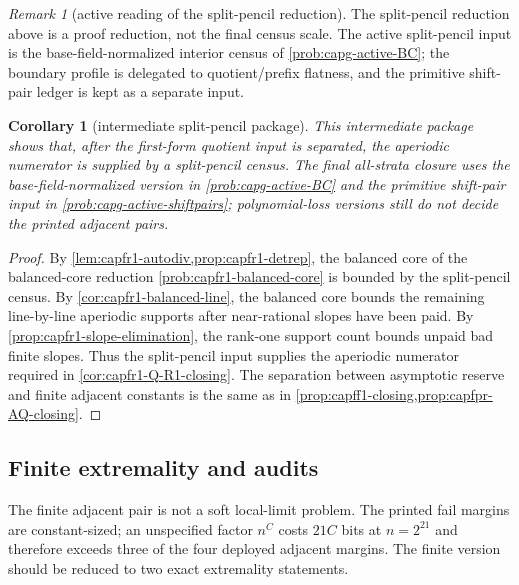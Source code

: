 \documentclass[11pt]{article}
\newtheorem{corollary}[corollary]{Corollary}
\theoremstyle{definition}
\theoremstyle{remark}
\newtheorem{remark}[remark]{Remark}
\begin{document}
\begin{remark}[active reading of the split-pencil reduction]
\label{rem:capfr1-split-pencil-active-reading}
The split-pencil reduction above is a proof reduction, not the final census
scale.  The active split-pencil input is the base-field-normalized interior
census of \cref{prob:capg-active-BC}; the boundary profile is delegated to
quotient/prefix flatness, and the primitive shift-pair ledger is kept as a
separate input.
\end{remark}

\begin{corollary}[intermediate split-pencil package]\label{cor:capfr1-terminal-package}
This intermediate package shows that, after the first-form quotient input is separated, the aperiodic numerator is supplied by a split-pencil census.  The final all-strata closure uses the base-field-normalized version in \cref{prob:capg-active-BC} and the primitive shift-pair input in \cref{prob:capg-active-shiftpairs}; polynomial-loss versions still do not decide the printed adjacent pairs.
\end{corollary}

\begin{proof}
By \cref{lem:capfr1-autodiv,prop:capfr1-detrep}, the balanced core of the balanced-core reduction \cref{prob:capfr1-balanced-core} is bounded by the split-pencil census.  By \cref{cor:capfr1-balanced-line}, the balanced core bounds the remaining line-by-line aperiodic supports after near-rational slopes have been paid.  By \cref{prop:capfr1-slope-elimination}, the rank-one support count bounds unpaid bad finite slopes.  Thus the split-pencil input supplies the aperiodic numerator required in \cref{cor:capfr1-Q-R1-closing}.  The separation between asymptotic reserve and finite adjacent constants is the same as in \cref{prop:capff1-closing,prop:capfpr-AQ-closing}.
\end{proof}

\subsection{Finite extremality and audits}\label{subsec:capfr1-finite-audits}

The finite adjacent pair is not a soft local-limit problem.  The printed fail margins are constant-sized; an unspecified factor \(n^C\) costs \(21C\) bits at \(n=2^{21}\) and therefore exceeds three of the four deployed adjacent margins.  The finite version should be reduced to two exact extremality statements.
\end{document}
